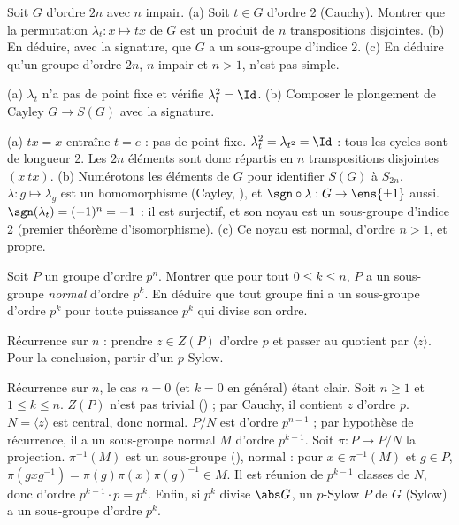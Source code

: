 \begin{exo}
Soit $G$ d'ordre $2n$ avec $n$ impair. (a) Soit $t\in G$ d'ordre 2 (Cauchy). Montrer que la permutation $\lambda_t:x\mapsto tx$ de $G$ est un produit de $n$ transpositions disjointes. (b) En déduire, avec la signature, que $G$ a un sous-groupe d'indice 2. (c) En déduire qu'un groupe d'ordre $2n$, $n$ impair et $n>1$, n'est pas simple.
\begin{indication}
(a) $\lambda_t$ n'a pas de point fixe et vérifie $\lambda_t^2=\Id$. (b) Composer le plongement de Cayley $G\to S(G)$ avec la signature.
\end{indication}
\begin{corrige}
(a) $tx=x$ entraîne $t=e$ : pas de point fixe. $\lambda_t^2=\lambda_{t^2}=\Id$ : tous les cycles sont de longueur 2. Les $2n$ éléments sont donc répartis en $n$ transpositions disjointes $(x\ tx)$.
(b) Numérotons les éléments de $G$ pour identifier $S(G)$ à $S_{2n}$. $\lambda:g\mapsto\lambda_g$ est un homomorphisme (Cayley, ), et $\sgn\circ\lambda:G\to\ens{\pm1}$ aussi. $\sgn(\lambda_t)=(-1)^n=-1$ : il est surjectif, et son noyau est un sous-groupe d'indice 2 (premier théorème d'isomorphisme).
(c) Ce noyau est normal, d'ordre $n>1$, et propre.
\end{corrige}
\end{exo}

\begin{exo}\label{exo-p-sous-groupes}
Soit $P$ un groupe d'ordre $p^n$. Montrer que pour tout $0\le k\le n$, $P$ a un sous-groupe \emph{normal} d'ordre $p^k$. En déduire que tout groupe fini a un sous-groupe d'ordre $p^k$ pour toute puissance $p^k$ qui divise son ordre.
\begin{indication}
Récurrence sur $n$ : prendre $z\in Z(P)$ d'ordre $p$ et passer au quotient par $\langle z\rangle$. Pour la conclusion, partir d'un $p$-Sylow.
\end{indication}
\begin{corrige}
Récurrence sur $n$, le cas $n=0$ (et $k=0$ en général) étant clair. Soit $n\ge1$ et $1\le k\le n$. $Z(P)$ n'est pas trivial () ; par Cauchy, il contient $z$ d'ordre $p$. $N=\langle z\rangle$ est central, donc normal. $P/N$ est d'ordre $p^{n-1}$ ; par hypothèse de récurrence, il a un sous-groupe normal $M$ d'ordre $p^{k-1}$. Soit $\pi:P\to P/N$ la projection. $\pi^{-1}(M)$ est un sous-groupe (), normal : pour $x\in\pi^{-1}(M)$ et $g\in P$, $\pi(gxg^{-1})=\pi(g)\pi(x)\pi(g)^{-1}\in M$. Il est réunion de $p^{k-1}$ classes de $N$, donc d'ordre $p^{k-1}\cdot p=p^k$. Enfin, si $p^k$ divise $\abs G$, un $p$-Sylow $P$ de $G$ (Sylow) a un sous-groupe d'ordre $p^k$.
\end{corrige}
\end{exo}

